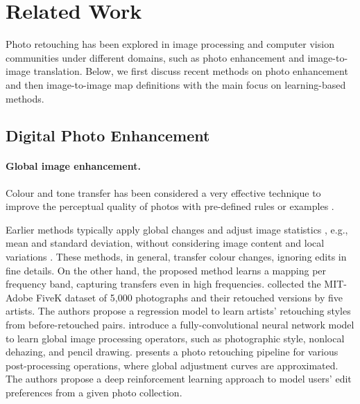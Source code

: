 \section{Related Work}

Photo retouching has been explored in image processing and computer vision communities under different domains, such as photo enhancement and image-to-image translation. Below, we first discuss recent methods on photo enhancement and then image-to-image map definitions with the main focus on learning-based methods.

\subsection{Digital Photo Enhancement}
\paragraph{Global image enhancement.} Colour and tone transfer has been considered a very effective technique to improve the perceptual quality of photos with pre-defined rules or examples \cite{Faridul14ASurvey, mustafa2022distilling}. 

Earlier methods typically apply global changes and adjust image statistics \cite{Bychkovsky11Learning, Bae06Two, Pitie05NDimensional,Pitie07Automated,Reinhard01Color,Sunkavalli10Multi, he2020conditional, park2018distort}, e.g., mean and standard deviation, without considering image content and local variations \cite{CohenOr06Color}. These methods, in general, transfer colour changes, ignoring edits in fine details. On the other hand, the proposed method learns a mapping per frequency band, capturing transfers even in high frequencies. \citeauthor{Bychkovsky11Learning} \cite{Bychkovsky11Learning} collected the MIT-Adobe FiveK dataset of 5,000 photographs and their retouched versions by five artists. The authors propose a regression model to learn artists' retouching styles from before-retouched pairs. \citeauthor{chen2017fast} \cite{chen2017fast} introduce a fully-convolutional neural network model to learn global image processing operators, such as photographic style, nonlocal dehazing, and pencil drawing. \citeauthor{Hu18Exposure} \cite{Hu18Exposure} presents a photo retouching pipeline for various post-processing operations, where global adjustment curves are approximated. The authors propose a deep reinforcement learning approach to model users' edit preferences from a given photo collection. 
 
